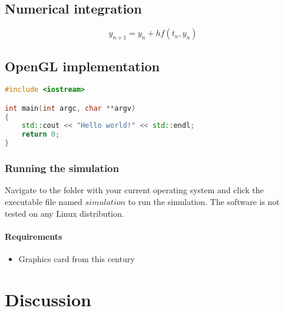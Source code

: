 \documentclass[a4paper,12pt]{report}
\begin{document}
\lipsum[0-1]

\section{Numerical integration}

\lipsum[0-1]

\begin{equation}
y_{n+1}=y_{n}+hf(t_n, y_n)
\label{e4}
\end{equation}

\section{OpenGL implementation}

\lipsum[0-1]

\begin{lstlisting}[caption={This is a Hello World application written in C++.}, language={C++}]
#include <iostream>

int main(int argc, char **argv)
{
    std::cout << "Hello world!" << std::endl;
    return 0;
}
\end{lstlisting}

\subsection{Running the simulation}
Navigate to the folder with your current operating system and click the executable file named $simulation$ to run the simulation. The software is not tested on any Linux distribution.

\subsubsection{Requirements}
\begin{itemize}
    \item Graphics card from this century
\end{itemize}


\chapter{Discussion}

\lipsum[0-1]






\end{document}
